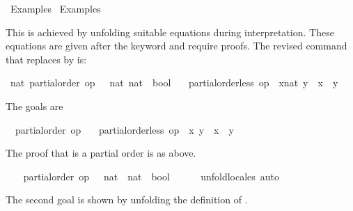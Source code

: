 %
\begin{isabellebody}%
\def\isabellecontext{Examples{\isadigit{2}}}%
%
\isadelimtheory
%
\endisadelimtheory
%
\isatagtheory
{}\isamarkupfalse%
\ Examples{}\isanewline
{}\ Examples\isanewline
{}%
\endisatagtheory
{\isafoldtheory}%
%
\isadelimtheory
%
\endisadelimtheory
%
\begin{isamarkuptext}%
This is achieved by unfolding suitable equations during
  interpretation.  These equations are given after the keyword
   and require proofs.  The revised command
  that replaces \isa{{\isasymsqsubset}} by \isa{{\isacharless}} is:%
\end{isamarkuptext}%
\isamarkuptrue%
%
\isadelimvisible
%
\endisadelimvisible
%
\isatagvisible
{}\isamarkupfalse%
\ nat{\isacharcolon}\ partial{\isacharunderscore}order\ {\isachardoublequoteopen}op\ {\isasymle}\ {\isacharcolon}{\isacharcolon}\ {\isacharbrackleft}nat{\isacharcomma}\ nat{\isacharbrackright}\ {\isasymRightarrow}\ bool{\isachardoublequoteclose}\isanewline
\ \ \ {\isachardoublequoteopen}partial{\isacharunderscore}order{\isachardot}less\ op\ {\isasymle}\ {\isacharparenleft}x{\isacharcolon}{\isacharcolon}nat{\isacharparenright}\ y\ {\isacharequal}\ {\isacharparenleft}x\ {\isacharless}\ y{\isacharparenright}{\isachardoublequoteclose}\isanewline
{}\isamarkupfalse%
\ {\isacharminus}%
\begin{isamarkuptxt}%
The goals are \begin{isabelle}%
\ {}{\isachardot}\ partial{\isacharunderscore}order\ op\ {\isasymle}\isanewline
\ {}{\isachardot}\ partial{\isacharunderscore}order{\isachardot}less\ op\ {\isasymle}\ x\ y\ {\isacharequal}\ {\isacharparenleft}x\ {\isacharless}\ y{\isacharparenright}%
\end{isabelle}
    The proof that \isa{{\isasymle}} is a partial order is as above.%
\end{isamarkuptxt}%
\isamarkuptrue%
\ \ \isamarkupfalse%
\ {\isachardoublequoteopen}partial{\isacharunderscore}order\ {\isacharparenleft}op\ {\isasymle}\ {\isacharcolon}{\isacharcolon}\ nat\ {\isasymRightarrow}\ nat\ {\isasymRightarrow}\ bool{\isacharparenright}{\isachardoublequoteclose}\isanewline
\ \ \ \ \isamarkupfalse%
\ unfold{\isacharunderscore}locales\ auto%
\begin{isamarkuptxt}%
The second goal is shown by unfolding the
    definition of .%

\end{isamarkuptxt}
\end{isabellebody}
